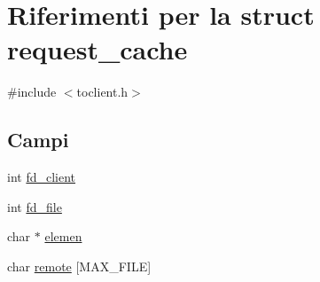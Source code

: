 \hypertarget{structrequest__cache}{
\section{Riferimenti per la struct request\_\-cache}
\label{structrequest__cache}
}


{\ttfamily \#include $<$toclient.h$>$}

\subsection*{Campi}
\begin{DoxyCompactItemize}
\item 
int \hyperlink{structrequest__cache_ab27cbab9f719741ae489f4430e7da682}{fd\_\-client}
\item 
int \hyperlink{structrequest__cache_aaf09572743c4a2b54d890e4b84a29e8b}{fd\_\-file}
\item 
char $\ast$ \hyperlink{structrequest__cache_a59234fac7de2e701b706493c82ca1dcc}{elemen}
\item 
char \hyperlink{structrequest__cache_a7fe39e9d4981bcb775ecf23bb7197271}{remote} \mbox{[}MAX\_\-FILE\mbox{]}
\end{DoxyCompactItemize}


